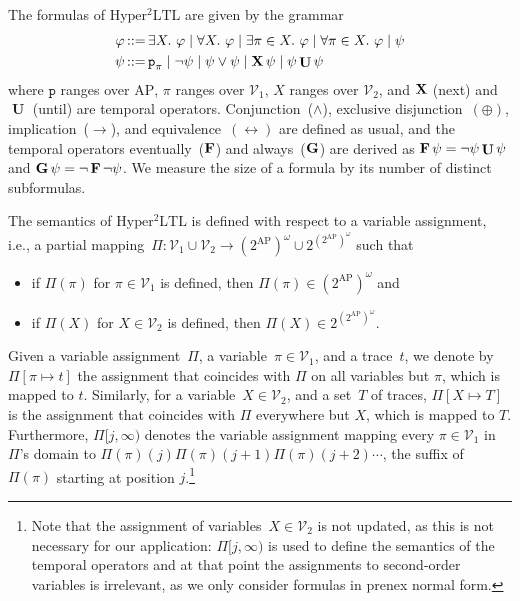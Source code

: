 \documentclass[dvipsnames,10pt,a4paper]{amsart}
\theoremstyle{definition}
\theoremstyle{remark}
\renewcommand{\phi}{\varphi}
\newcommand{\pow}[1]{2^{#1}}
\newcommand{\cceq}{\mathop{::=}}
\newcommand{\F}{\mathop{\mathbf{F}\vphantom{a}}\nolimits}
\newcommand{\G}{\mathop{\mathbf{G}\vphantom{a}}\nolimits}
\DeclareMathOperator{\U}{\mathbf{U}}
\newcommand{\X}{\mathop{\mathbf{X}\vphantom{a}}\nolimits}
\newcommand{\sohyltl}{\mathrm{Hyper^2LTL}\xspace}
\newcommand{\suffix}[2]{#1[#2,\infty)}
\newcommand{\fovar}{\mathcal{V}_1}
\newcommand{\sovar}{\mathcal{V}_2}
\newcommand{\ap}[0]{\mathrm{AP}}
\newcommand{\proposition}{\texttt{p}}
\begin{document}
The formulas of $\sohyltl$ are given by the grammar
\begin{align*}
\phi  {} \cceq {}&{} \exists X.\ \phi \mid \forall X.\ \phi \mid \exists \pi \in X.\ \phi \mid \forall \pi \in X.\ \phi \mid \psi \\
\psi {}  \cceq {}&{} \proposition_\pi \mid \neg \psi \mid \psi \vee \psi \mid \X \psi \mid \psi \U \psi    
\end{align*}
where $\proposition$ ranges over $\ap$, $\pi$ ranges over $\fovar$, $X$ ranges over $\sovar$, and $\X$ (next) and $\U$ (until) are temporal operators. Conjunction~($\wedge$), exclusive disjunction~$(\oplus)$, implication~($\rightarrow$), and equivalence~$(\leftrightarrow)$ are defined as usual, and the temporal operators eventually~($\F$) and always~($\G$) are derived as $\F\psi = \neg \psi\U \psi$ and $\G \psi = \neg \F \neg \psi$. We measure the size of a formula by its number of distinct subformulas.

The semantics of $\sohyltl$ is defined with respect to a variable assignment, i.e., a partial mapping~$\Pi \colon \fovar \cup \sovar \rightarrow (\pow{\ap})^\omega \cup \pow{(\pow{\ap})^\omega}$
such that
\begin{itemize}
    \item if $\Pi(\pi)$ for $\pi\in\fovar$ is defined, then $\Pi(\pi) \in (\pow{\ap})^\omega$ and
    \item if $\Pi(X)$ for $X \in\sovar$ is defined, then $\Pi(X) \in \pow{(\pow{\ap})^\omega}$.
\end{itemize}
Given a variable assignment~$\Pi$, a variable~$\pi \in \fovar$, and a trace~$t$, we denote by $\Pi[\pi \mapsto t]$ the assignment that coincides with $\Pi$ on all variables but $\pi$, which is mapped to $t$. 
Similarly, for a variable~$X \in \sovar$, and a set~$T$ of traces, $\Pi[X \mapsto T]$ is the assignment that coincides with $\Pi$ everywhere but $X$, which is mapped to $T$.
Furthermore, $\suffix{\Pi}{j}$ denotes the variable assignment mapping every $\pi \in \fovar$ in $\Pi$'s domain to $\Pi(\pi)(j)\Pi(\pi)(j+1)\Pi(\pi)(j+2) \cdots $, the suffix of $\Pi(\pi)$ starting at position $j$.\footnote{Note that the assignment of variables~$X \in \sovar$ is not updated, as this is not necessary for our application: $\suffix{\Pi}{j}$ is used to define the semantics of the temporal operators and at that point the assignments to second-order variables is irrelevant, as we only consider formulas in prenex normal form.}
\end{document}
